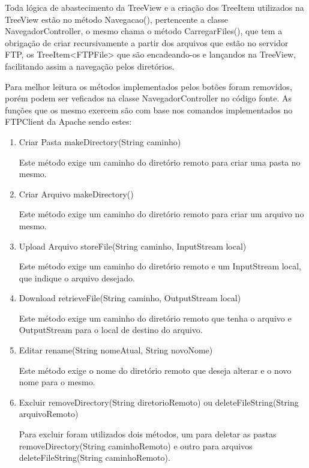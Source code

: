 \documentclass[12pt]{article}
\begin{document}
Toda lógica de abastecimento da TreeView e a criação dos TreeItem utilizados na TreeView estão no método Navegacao(), pertencente a classe NavegadorController, o mesmo chama o método CarregarFiles(), que tem a obrigação de criar recursivamente a partir dos arquivos que estão no servidor FTP, os TreeItem<FTPFile> que são encadeando-os e lançandos na TreeView, facilitando assim a navegação pelos diretórios.

Para melhor leitura os métodos implementados pelos botões foram removidos, porém podem ser veficados na classe NavegadorController no código fonte. As funções que os mesmo exercem são com base nos comandos implementados no FTPClient da Apache sendo estes:
\begin{enumerate}
\item {Criar Pasta} makeDirectory(String caminho)	
	
Este método exige um caminho do diretório remoto para criar uma pasta no mesmo.  
	
\item {Criar Arquivo} makeDirectory()	
	
Este método exige um caminho do diretório remoto para criar um arquivo no mesmo.

\item {Upload Arquivo } storeFile(String caminho, InputStream local)	

Este método exige um caminho do diretório remoto e um InputStream local, que indique o arquivo desejado.

\item {Download } retrieveFile(String caminho, OutputStream local)	

Este método exige um caminho do diretório remoto que tenha o arquivo e OutputStream para o local de destino do arquivo.

\item {Editar} rename(String nomeAtual, String novoNome)	

Este método exige o nome do diretório remoto que deseja alterar e o novo nome para o mesmo.  

\item {Excluir} removeDirectory(String diretorioRemoto) ou  deleteFileString(String arquivoRemoto) 

Para excluir foram utilizados dois métodos, um para deletar as pastas removeDirectory(String caminhoRemoto) e outro para arquivos deleteFileString(String caminhoRemoto).

\end{enumerate}
\end{document}
